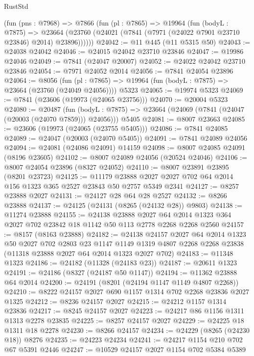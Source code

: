 \begin{lexlean}{RustStd}
\begin{coremodule}
    (fun (pns : @7968) =>
    @7866
      (fun (pl : @7865) =>
      @19964
        (fun (bodyL : @7875) =>
        @23664 (@23760 (@24021 (@7841 (@7971 (@24022 @7901 @23710 @23846) @2014) @23896))))))
@24042 := @11 @445 (@11 @5315 @50)
@24043 := @24038 @24042
@24046 := @24015 @24042 @23710 @23846
@24047 := @19986 @24046
@24049 := @7841 (@24047 @20007)
@24052 := @24022 @24042 @23710 @23846
@24054 := @7971 @24052 @2014
@24056 := @7841 @24054 @23896
@24064 := @8056
    (fun (pl : @7865) => @19964 (fun (bodyL : @7875) => @23664 (@23760 (@24049 @24056))))
    @5323
@24065 := @19974 @5323
@24069 := @7841 (@23606 (@19973 (@24065 @23756)))
@24070 := @20004 @5323
@24080 := @20487
    (fun (bodyL : @7875) => @23664 (@24069 (@7841 (@24047 (@20003 (@24070 @7859))) @24056)))
    @5405
@24081 := @8007 @23663
@24085 := @23606 (@19973 (@24065 (@23755 @5405)))
@24086 := @7841 @24085
@24089 := @24047 (@20003 (@24070 @5405))
@24091 := @7841 @24089 @24056
@24094 := @24081 (@24086 @24091) @14159
@24098 := @8007 @24085 @24091 (@8196 @23605)
@24102 := @8007 @24089 @24056 (@20524 @24046)
@24106 := @8007 @24054 @23896 (@8327 @24052)
@24110 := @8007 @23891 @23895 (@8201 @23723)
@24125 := @11179
    @23888
    @2027
    @2027
    @702
    @64
    @2014
    @156
    @1323
    @365
    @2527
    @23843
    @50
    @2757
    @5349
    @2341
@24127 := @8257 @23888 @2027
@24131 := @24127 @28 @64 @28 @2527
@24132 := @8266 @23888
@24137 := @24125 (@24131 (@8265 (@24132 @28)) @9803)
@24138 := @11274 @23888
@24155 := @24138
    @23888
    @2027
    @64
    @2014
    @1323
    @364
    @2027
    @702
    @23842
    @18
    @1142
    @50
    @113
    @2778
    @2268
    @2268
    @2560
@24157 := @8157 (@8163 @23888)
@24182 := @24138
    @24157
    @2027
    @64
    @2014
    @1323
    @50
    @2027
    @702
    @2803
    @23
    @1147
    @1149
    @1319
    @4807
    @2268
    @2268
    @23838
    (@11318 @23888 @2027 @64 @2014 @1323 @2027 @702)
@24183 := @11348 @1323
@24186 := @24182 (@11328 (@24183 @23))
@24187 := @20611 @1323
@24191 := @24186 (@8327 (@24187 @50 @1147))
@24194 := @11362 @23888 @64 @2014
@24200 := @24191 (@8201 (@24194 @1147 @1149 @4807 @2268))
@24210 := @8222 @24157 @2027 @690 @1157 @1314 @702 @2268 @23836 @2027 @1325
@24212 := @8236 @24157 @2027
@24215 := @24212 @1157 @1314 @23836
@24217 := @8245 @24157 @2027
@24223 := @24217 @86 @1156 @1311 @1313 @2278 @23835
@24225 := @8257 @24157 @2027
@24229 := @24225 @18 @1311 @18 @2278
@24230 := @8266 @24157
@24234 := @24229 (@8265 (@24230 @18)) @8276
@24235 := @24223 @24234
@24241 := @24217 @1154 @210 @702 @67 @5391 @2446
@24247 := @10529 @24157 @2027 @1154 @702 @5384 @5389

\end{coremodule}
\end{lexlean}
